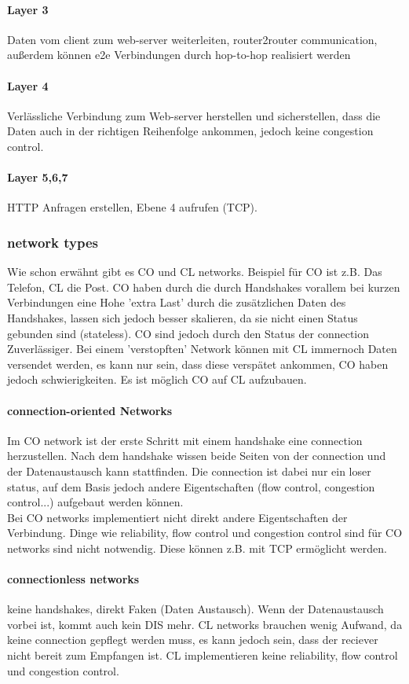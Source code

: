 			\paragraph{Layer 3}
				Daten vom client zum web-server weiterleiten, router2router communication, außerdem können e2e Verbindungen durch hop-to-hop realisiert werden
			\paragraph{Layer 4}
				Verlässliche Verbindung zum Web-server herstellen und sicherstellen, dass die Daten auch in der richtigen Reihenfolge ankommen, jedoch keine congestion control. 
			
			\paragraph{Layer 5,6,7}
				HTTP Anfragen erstellen, Ebene 4 aufrufen (TCP). 
			
		\subsubsection{network types}
			Wie schon erwähnt gibt es CO und CL networks. Beispiel für CO ist z.B. Das Telefon, CL die Post. CO haben durch die durch Handshakes vorallem bei kurzen Verbindungen eine Hohe 'extra Last' durch die zusätzlichen Daten des Handshakes, lassen sich jedoch besser skalieren, da sie nicht einen Status gebunden sind (stateless). CO sind jedoch durch den Status der connection Zuverlässiger. Bei einem 'verstopften' Network können mit CL immernoch Daten versendet werden, es kann nur sein, dass diese verspätet ankommen, CO haben jedoch schwierigkeiten. Es ist möglich CO auf CL aufzubauen.
			\paragraph{connection-oriented Networks}
				Im CO network ist der erste Schritt mit einem handshake eine connection herzustellen. Nach dem handshake wissen beide Seiten von der connection und der Datenaustausch kann stattfinden. Die connection ist dabei nur ein loser status, auf dem Basis jedoch andere Eigentschaften (flow control, congestion control...) aufgebaut werden können. \\ 
				Bei CO networks implementiert nicht direkt andere Eigentschaften der Verbindung. Dinge wie reliability, flow control und congestion control sind für CO networks sind nicht notwendig. Diese können z.B. mit TCP ermöglicht werden.
			\paragraph{connectionless networks}
				keine handshakes, direkt Faken (Daten Austausch). Wenn der Datenaustausch vorbei ist, kommt auch kein DIS mehr. CL networks brauchen wenig Aufwand, da keine connection gepflegt werden muss, es kann jedoch sein, dass der reciever nicht bereit zum Empfangen ist. CL implementieren keine reliability, flow control und congestion control. 
			
			